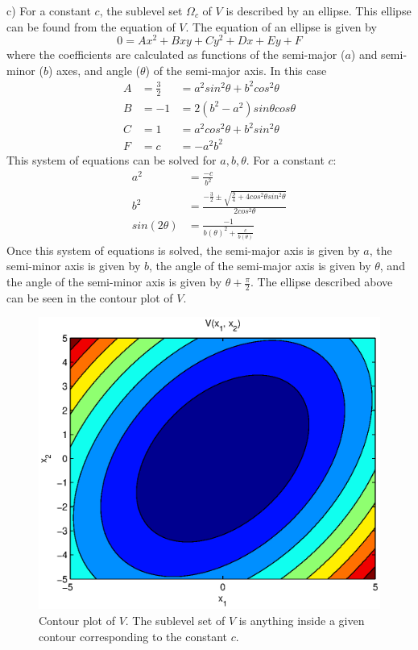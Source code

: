\documentclass[paper=a4, fontsize=11pt]{scrartcl} %
\numberwithin{equation}{section} %
\numberwithin{figure}{section} %
\numberwithin{table}{section} %
\begin{document}
c) For a constant $c$, the sublevel set $\Omega_c$ of $V$ is described by an ellipse. This ellipse can be found from the equation of $V$. The equation of an ellipse is given by 
\begin{equation}
0=Ax^2+Bxy+Cy^2+Dx+Ey+F
\end{equation}
where the coefficients are calculated as functions of the semi-major ($a$) and semi-minor ($b$) axes, and angle ($\theta$) of the semi-major axis. In this case
\begin{align}
A &= \frac{3}{2} &= a^2sin^2\theta + b^2cos^2\theta \\
B &= -1 &= 2(b^2-a^2)sin\theta cos\theta \\
C &= 1 &= a^2cos^2\theta + b^2sin^2\theta \\
F &= c &= -a^2b^2
\end{align}
This system of equations can be solved for $a, b, \theta$. For a constant $c$:
\begin{align}
a^2 &= \frac{-c}{b^2} \\
b^2 &= \frac{-\frac{3}{2} \pm \sqrt{\frac{9}{4}+4cos^2\theta sin^2\theta}}{2cos^2\theta} \\
sin(2\theta) &= \frac{-1}{b(\theta)^2 + \frac{c}{b(\theta)}} 
\end{align}
Once this system of equations is solved, the semi-major axis is given by $a$, the semi-minor axis is given by $b$, the angle of the semi-major axis is given by $\theta$, and the angle of the semi-minor axis is given by $\theta+\frac{\pi}{2}$.
The ellipse described above can be seen in the contour plot of $V$.
\begin{figure}[h!]
\label{contour1}
\centering
\includegraphics[scale=0.75]{prob3_ellipse}
\caption{Contour plot of $V$. The sublevel set of $V$ is anything inside a given contour corresponding to the constant $c$.}
\end{figure} 
\end{document}
